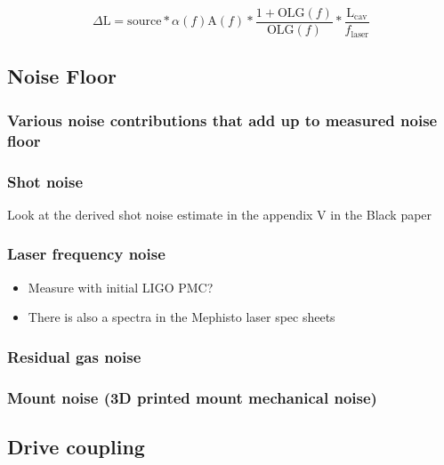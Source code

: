 $$\Delta \mathrm{L} = \mathrm{source}*\alpha(f) \mathrm{A}(f)*\frac{1+\mathrm{OLG}(f)}{\mathrm{OLG}(f)}*\frac{\mathrm{L_{cav}}}{f_\mathrm{laser}}$$

\subsection{Noise Floor}
\subsubsection{Various noise contributions that add up to measured noise floor}
\subsubsection{Shot noise}
Look at the derived shot noise estimate in the appendix V in the Black paper \cite{black_pdh}

\subsubsection{Laser frequency noise}

\begin{itemize}
\item Measure with initial LIGO PMC?
\item There is also a spectra in the Mephisto laser spec sheets
\end{itemize}

\subsubsection{Residual gas noise}


\subsubsection{Mount noise (3D printed mount mechanical noise)}

\subsection{Drive coupling}

